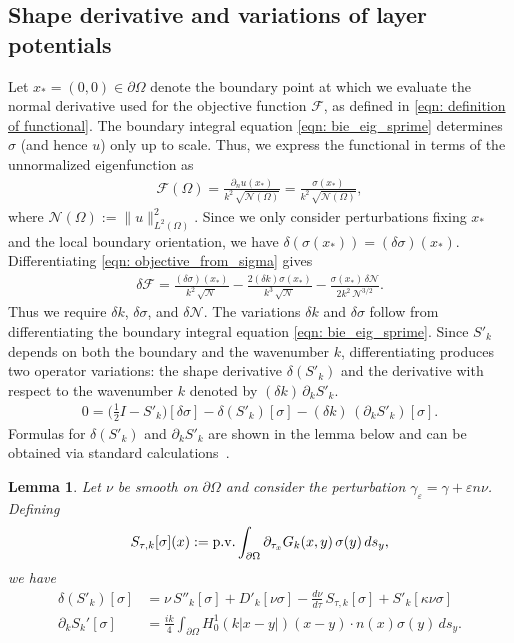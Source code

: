 \documentclass{amsart}
\theoremstyle{plain}
\newtheorem{lemma}[theorem]{Lemma}
\begin{document}
\subsection{Shape derivative and variations of layer potentials}
Let $x_\ast=(0,0)\in\partial \Omega$ denote the boundary point at which we evaluate the normal derivative used for the objective function $\mathcal{F}$, as defined in \eqref{eqn: definition of functional}.
The boundary integral equation \eqref{eqn: bie_eig_sprime} determines $\sigma$ (and hence $u$) only up to scale. Thus, we express the functional in terms of the unnormalized eigenfunction as
  \begin{align}\label{eqn: objective_from_sigma}
    \mathcal{F}(\Omega)
    = \frac{\partial_nu(x_\ast)}{k^2\,\sqrt{\mathcal{N}(\Omega)}}
    = \frac{\sigma(x_\ast)}{k^2\,\sqrt{\mathcal{N}(\Omega)}},
  \end{align}
where $\mathcal{N}(\Omega):=\|u\|_{L^2(\Omega)}^2$.
Since we only consider perturbations fixing $x_\ast$ and the local boundary orientation, we have $\delta(\sigma(x_\ast))=(\delta\sigma)(x_\ast)$.
Differentiating \eqref{eqn: objective_from_sigma} gives
  \begin{align}\label{eqn: dF_formula}
    \delta\mathcal{F}
    = \frac{(\delta\sigma)(x_\ast)}{k^2\,\sqrt{\mathcal{N}}}
      -\frac{2(\delta k)\sigma(x_\ast)}{k^3\,\sqrt{\mathcal{N}}}
      -\frac{\sigma(x_\ast)\,\delta\mathcal{N}}{2k^2\,\mathcal{N}^{3/2}}.
  \end{align}
Thus we require $\delta k$, $\delta\sigma$, and $\delta\mathcal{N}$.
The variations $\delta k$ and $\delta\sigma$ follow from differentiating the boundary integral equation \eqref{eqn: bie_eig_sprime}.
Since $S'_k$ depends on both the boundary and the wavenumber $k$, differentiating produces two operator variations: the shape derivative $\delta(S'_k)$ and the derivative with respect to the wavenumber $k$ denoted by $(\delta k)\,\partial_k S'_k$.
  \begin{align}
    0 = \Big(\frac{1}{2} I - S'_k\Big)[\delta\sigma] - \delta(S'_k)[\sigma] - (\delta k)\,(\partial_k S'_k)[\sigma].
  \end{align}
Formulas for $\delta(S'_k)$ and $\partial_k S'_k$ are shown in the lemma below and can be obtained via standard calculations~\cite{liu2020regularized}.
\begin{lemma}\label{lem: layer_variations}
Let $\nu$ be smooth on $\partial \Omega$ and consider the perturbation $\gamma_\varepsilon=\gamma+\varepsilon n \nu$. Defining
  \begin{align}
    S_{\tau,k}[\sigma](x)
    := {\rm p.v.}\int_{\partial \Omega} \partial_{\tau_x}G_k(x,y)\,\sigma(y)\,ds_y,
  \end{align}
we have 
  \begin{align}\label{eqn: delta_sprime}
    \delta\left(S'_k\right)[\sigma]
    &= \nu\,S''_k[\sigma] + D'_k[\nu\sigma] - \frac{d\nu}{d\tau}\,S_{\tau,k}[\sigma] + S'_k[\kappa \nu\sigma]\\
    \partial_kS_k'[\sigma]&=\frac{ik}{4}\int_{\partial\Omega}H_0^1(k|x-y|)(x-y)\cdot n(x)\sigma(y)\,ds_y.
  \end{align}
\end{lemma}
\end{document}
